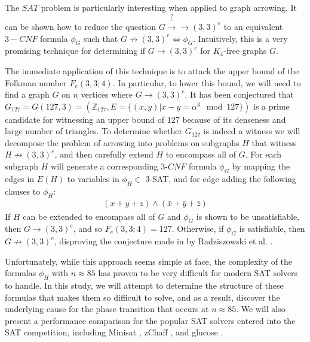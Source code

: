 \documentclass[paper=a4, fontsize=11pt]{scrartcl} %
\begin{document}
The $SAT$ problem is particularly interesting when applied to graph arrowing. It can be shown
how to reduce the question $G \overbrace{\to}^\text{?} \to (3,3)^e$ to an equivalent $3-CNF$ formula
$\phi_G$ such that $G \not \to (3,3)^e \Leftrightarrow \phi_G$. Intuitively, this is a very promising
technique for determining if $G \to (3,3)^e$ for $K_4$-free graphs $G$.

The immediate application of this technique is to attack the upper bound of the Folkman number
$F_e(3,3;4)$. In particular, to lower this bound, we will need to find a 
graph $G$ on $n$ vertices where $G \to (3,3)^e$. It has been conjectured that 
$G_{127} = G(127,3) = (\mathbb{Z}_{127}, E = \{(x,y) | x - y = \alpha^3 \mod 127\})$ is a
prime candidate for witnessing an upper bound of $127$ because of its denseness and large number
of triangles. To determine whether $G_{127}$ is indeed a witness we will decompose 
the problem of arrowing into problems on subgraphs $H$ that witness $H \not \to (3,3)^e$, 
and then carefully extend $H$ to encompass all of $G$. For each subgraph $H$ will generate
a corresponding $3$-$CNF$ formula $\phi_G$ by mapping the edges in $E(H)$ to variables 
in $\phi_H \in$ 3-SAT, and for edge adding the following clauses to $\phi_H$:
\begin{align*}
(x + y + z) \wedge (\bar{x} + \bar{y} + \bar{z})
\end{align*}
If $H$ can be extended to encompass all of $G$ and $\phi_G$ is 
shown to be unsatisfiable, then $G \to (3,3)^e$, and so $F_e(3,3;4) = 127$.
Otherwise, if $\phi_G$ is satisfiable, then $G \not \to (3,3)^e$, disproving the
conjecture made in by Radziszowski et al. \cite{Radziszowski07-1}.

Unfortunately, while this approach seems simple at face, the complexity of the formulas
$\phi_H$ with $n \approx 85$ has proven to be very difficult for modern SAT solvers
to handle. In this study, we will attempt to determine the structure of these formulas
that makes them so difficult to solve, and as a result, discover the underlying
cause for the phase transition that occurs at $n \approx 85$. 
We will also present a performance comparison for the popular 
SAT solvers entered into the SAT competition, including Minisat \cite{minisat}, 
zChaff \cite{chaff, zchaff}, and glucose \cite{Audemard09-1}. 

\end{document}

